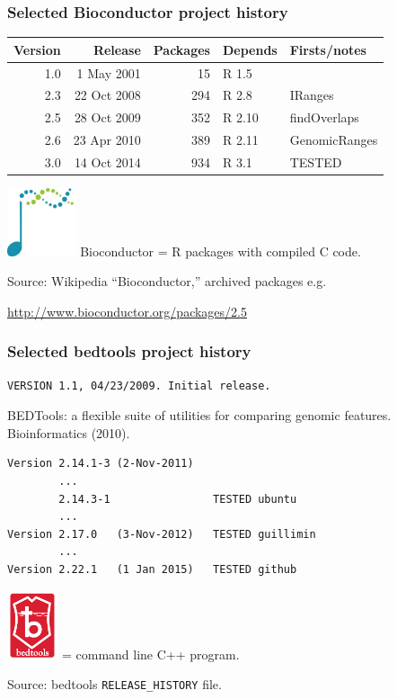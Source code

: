 \documentclass{beamer}
\begin{document}
\begin{frame}
  \frametitle{Selected Bioconductor project history}

  \begin{tabular}{rrrll}
    Version & Release & Packages & Depends & Firsts/notes \\
    \hline
    1.0 & 1 May 2001 & 15 & R 1.5 \\
    2.3 & 22 Oct 2008 & 294 & R 2.8 & IRanges\\
    2.5 & 28 Oct 2009 & 352 & R 2.10 & findOverlaps\\
    2.6 & 23 Apr 2010 & 389 & R 2.11 & GenomicRanges\\
    3.0 & 14 Oct 2014 & 934 & R 3.1 & TESTED
  \end{tabular}

  \includegraphics[height=2cm]{bioconductor} Bioconductor = R packages
  with compiled C code.

  \vskip 1cm

  Source: Wikipedia ``Bioconductor,'' archived packages e.g.

  \url{http://www.bioconductor.org/packages/2.5}

\end{frame}

\begin{frame}
  \frametitle{Selected bedtools project history}

\begin{verbatim}
VERSION 1.1, 04/23/2009. Initial release.
\end{verbatim}

  BEDTools: a flexible suite of utilities for comparing genomic
  features. Bioinformatics (2010).

\begin{verbatim}
Version 2.14.1-3 (2-Nov-2011)
        ...
        2.14.3-1                TESTED ubuntu
        ...
Version 2.17.0   (3-Nov-2012)   TESTED guillimin
        ...
Version 2.22.1   (1 Jan 2015)   TESTED github
\end{verbatim}

  \includegraphics[height=2cm]{bedtools} = command line C++ program.

Source: bedtools \verb|RELEASE_HISTORY| file.
  
\end{frame}
\end{document}
